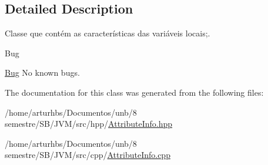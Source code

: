 \subsection{Detailed Description}
Classe que contém as características das variáveis locais;. 

\begin{DoxyRefDesc}{Bug}
\item[\hyperlink{bug__bug000011}{Bug}]No known bugs. \end{DoxyRefDesc}


The documentation for this class was generated from the following files\+:\begin{DoxyCompactItemize}
\item 
/home/arturhbs/\+Documentos/unb/8 semestre/\+S\+B/\+J\+V\+M/src/hpp/\hyperlink{AttributeInfo_8hpp}{Attribute\+Info.\+hpp}\item 
/home/arturhbs/\+Documentos/unb/8 semestre/\+S\+B/\+J\+V\+M/src/cpp/\hyperlink{AttributeInfo_8cpp}{Attribute\+Info.\+cpp}\end{DoxyCompactItemize}
